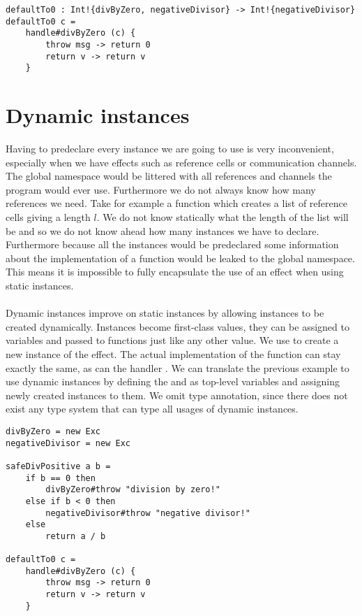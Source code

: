 \begin{verbatim}
defaultTo0 : Int!{divByZero, negativeDivisor} -> Int!{negativeDivisor}
defaultTo0 c =
	handle#divByZero (c) {
		throw msg -> return 0
		return v -> return v
	}
\end{verbatim}

\section{Dynamic instances}
\label{sec:background-dynamicinst}

Having to predeclare every instance we are going to use is very inconvenient, especially when we have effects such as reference cells or communication channels. The global namespace would be littered with all references and channels the program would ever use. Furthermore we do not always know how many references we need. Take for example a function which creates a list of reference cells giving a length $l$. We do not know statically what the length of the list will be and so we do not know ahead how many instances we have to declare.
Furthermore because all the instances would be predeclared some information about the implementation of a function would be leaked to the global namespace. This means it is impossible to fully encapsulate the use of an effect when using static instances.
\\\\
Dynamic instances improve on static instances by allowing instances to be created dynamically.
Instances become first-class values, they can be assigned to variables and passed to functions just like any other value.
We use  to create a new instance of the  effect.
The actual implementation of the function can stay exactly the same, as can the handler .
We can translate the previous example to use dynamic instances by defining the  and  as top-level variables and assigning newly created instances to them. We omit type annotation, since there does not exist any type system that can type all usages of dynamic instances.

\begin{verbatim}
divByZero = new Exc
negativeDivisor = new Exc

safeDivPositive a b =
	if b == 0 then
		divByZero#throw "division by zero!"
	else if b < 0 then
		negativeDivisor#throw "negative divisor!"
	else
		return a / b
		
defaultTo0 c =
	handle#divByZero (c) {
		throw msg -> return 0
		return v -> return v
	}
\end{verbatim}


